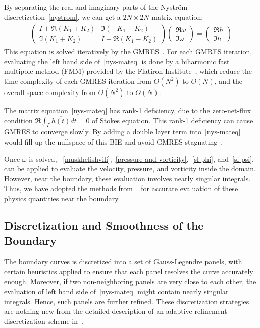 \documentclass[10pt,twocolumn,letterpaper]{article}
\begin{document}
By separating the real and imaginary parts of the Nystr\"om discretizetion~\eqref{nystrom}, 
we can get a $2N\times 2N$ matrix equation:
\begin{align}
  \begin{pmatrix}
    I + \Re(K_1 + K_2) & \Im(-K_1 + K_2) \\
    \Im(K_1 + K_2) & I + \Re(K_1 - K_2)  
  \end{pmatrix}
  \begin{pmatrix}
    \Re \omega  \\ \Im \omega 
  \end{pmatrix}
  =
  \begin{pmatrix}
    \Re h \\ \Im h
  \end{pmatrix}
  \label{nys-mateq}
\end{align}
This equation is solved iteratively by the GMRES~\cite{saadGMRESGeneralizedMinimal1986}.
For each GMRES iteration, evaluating the left hand side of~\eqref{nys-mateq}
is done by a biharmonic fast multipole method (FMM) 
provided by the Flatiron Institute~\cite{FlatironinstituteFmm2d2022}, 
which reduce the time complexity of each GMRES iteration from $O(N^2)$ to $O(N)$, 
and the overall space complexity from $O(N^2)$ to $O(N)$. 

The matrix equation~\eqref{nys-mateq} has rank-1 deficiency, 
due to the zero-net-flux condition $\Re \int_\Gamma \overline{h(t)} dt = 0$ 
of Stokes equation. This rank-1 deficiency can cause GMRES to converge slowly. 
By adding a double layer term into~\eqref{nys-mateq} would fill up 
the nullspace of this BIE and avoid GMRES stagnating~\cite{zhangFastDirectSolver2022}. 

Once $\omega$ is solved, 
~\eqref{muskhelishvili},~\eqref{pressure-and-vorticity},~\eqref{sl-phi}, and~\eqref{sl-psi}, 
can be applied to evaluate the velocity, pressure, and vorticity inside the domain. 
However, near the boundary, these evaluation involves nearly singular integrals. 
Thus, we have adopted the methods from
~\cite{wuSolutionStokesFlow2020,helsingEvaluationLayerPotentials2008} 
for accurate evaluation of these physics quantities near the boundary.

\subsection{Discretization and Smoothness of the Boundary}

The boundary curves is discretized into a set of Gauss-Legendre panels, 
with certain heuristics applied to ensure that each panel resolves 
the curve accurately enough. 
Moreover, if two non-neighboring panels are very close to each other, 
the evaluation of left hand side of~\eqref{nys-mateq} might contain 
nearly singular integrals. Hence, such panels are further refined. 
These discretization strategies are nothing new from
the detailed description of an adaptive refinement discretization scheme 
in~\cite{wuSolutionStokesFlow2020}.  
\end{document}
